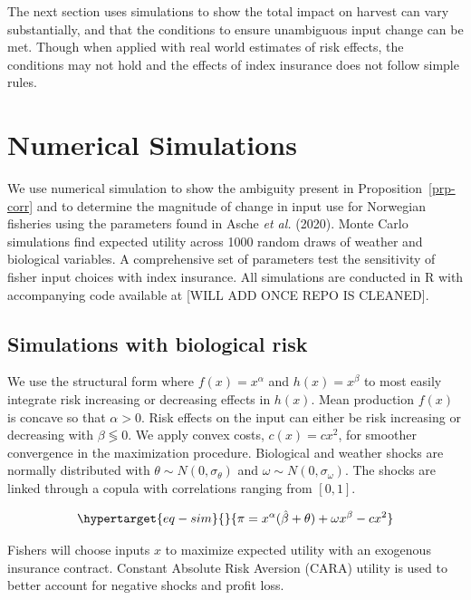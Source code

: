 \documentclass[
  letterpaper,
  DIV=11,
  numbers=noendperiod]{scrartcl}
\theoremstyle{plain}
\theoremstyle{plain}
\theoremstyle{remark}
\begin{document}
The next section uses simulations to show the total impact on harvest
can vary substantially, and that the conditions to ensure unambiguous
input change can be met. Though when applied with real world estimates
of risk effects, the conditions may not hold and the effects of index
insurance does not follow simple rules.

\hypertarget{sec-sim}{%
\section{Numerical Simulations}\label{sec-sim}}

We use numerical simulation to show the ambiguity present in
Proposition~\ref{prp-corr} and to determine the magnitude of change in
input use for Norwegian fisheries using the parameters found in Asche
\emph{et al.} (2020). Monte Carlo simulations find expected utility
across 1000 random draws of weather and biological variables. A
comprehensive set of parameters test the sensitivity of fisher input
choices with index insurance. All simulations are conducted in R with
accompanying code available at {[}WILL ADD ONCE REPO IS CLEANED{]}.

\hypertarget{simulations-with-biological-risk}{%
\subsection{Simulations with biological
risk}\label{simulations-with-biological-risk}}

We use the structural form where \(f(x)=x^\alpha\) and \(h(x)=x^\beta\)
to most easily integrate risk increasing or decreasing effects in
\(h(x)\). Mean production \(f(x)\) is concave so that \(\alpha>0\). Risk
effects on the input can either be risk increasing or decreasing with
\(\beta\lessgtr0\). We apply convex costs, \(c(x)=cx^2\), for smoother
convergence in the maximization procedure. Biological and weather shocks
are normally distributed with \(\theta\sim N(0,\sigma_{\theta})\) and
\(\omega\sim N(0,\sigma_{\omega})\). The shocks are linked through a
copula with correlations ranging from \([0,1]\).

\begin{equation}\protect\hypertarget{eq-sim}{}{
\pi=x^\alpha(\hat\beta+\theta)+\omega x^\beta-cx^2
}\label{eq-sim}\end{equation}

Fishers will choose inputs \(x\) to maximize expected utility with an
exogenous insurance contract. Constant Absolute Risk Aversion (CARA)
utility is used to better account for negative shocks and profit loss.
\end{document}
